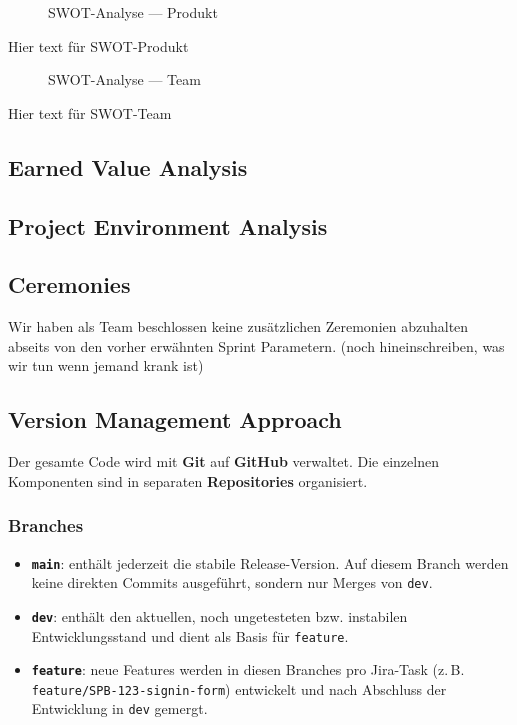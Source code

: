 \documentclass{article}
\newcommand{\branch}[1]{\texttt{#1}}
\begin{document}
\begin{figure}[H]
  \centering
  
  \caption{SWOT-Analyse — Produkt}
  \label{fig:swot-produkt}
\end{figure}

Hier text für SWOT-Produkt

\begin{figure}[H]
  \centering
  
  \caption{SWOT-Analyse — Team}
  \label{fig:swot-team}
\end{figure}

Hier text für SWOT-Team



\subsection{Earned Value Analysis}
\subsection{Project Environment Analysis}
\subsection{Ceremonies}
Wir haben als Team beschlossen keine zusätzlichen Zeremonien abzuhalten abseits von den vorher erwähnten Sprint Parametern.
(noch hineinschreiben, was wir tun wenn jemand krank ist)





\subsection{Version Management Approach}

Der gesamte Code wird mit \textbf{Git} auf \textbf{GitHub} verwaltet.
Die einzelnen Komponenten sind in separaten \textbf{Repositories} organisiert.

\subsubsection{Branches}
\begin{itemize}
  \item \textbf{\branch{main}}: enthält jederzeit die stabile Release-Version. Auf diesem Branch werden keine direkten Commits ausgeführt, sondern nur Merges von \branch{dev}.
  \item \textbf{\branch{dev}}: enthält den aktuellen, noch ungetesteten bzw. instabilen Entwicklungsstand und dient als Basis für \branch{feature}.
  \item \textbf{\branch{feature}}: neue Features werden in diesen Branches pro Jira-Task (z.\,B. \texttt{feature/SPB-123-signin-form}) entwickelt und nach Abschluss der Entwicklung in \branch{dev} gemergt.
\end{itemize}
\end{document}

